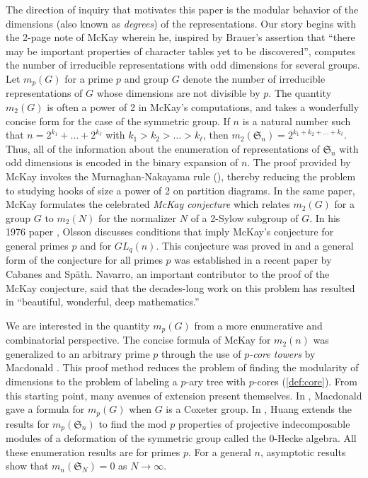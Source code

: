 \documentclass[12pt]{amsart}
\theoremstyle{definition}
\numberwithin{equation}{section}
\renewcommand{\SS}{\mathfrak{S}}
\begin{document}
The direction of inquiry that motivates this paper is the modular behavior of the dimensions (also known as \textit{degrees}) of the representations. Our story begins with the 2-page note of McKay \cite{mckay} wherein he, inspired by Brauer's assertion that ``there may be important properties of character tables yet to be discovered'', computes  the number of irreducible representations with odd dimensions for several groups. Let $m_p(G)$ for a prime $p$ and group $G$ denote the number of irreducible representations of $G$ whose dimensions are not divisible by $p$. The quantity $m_2(G)$ is often a power of 2 in McKay's computations, and takes a wonderfully concise form for the case of the symmetric group. If $n$ is a natural number such that $n = 2^{k_1}+\ldots + 2^{k_\ell}$ with $k_1 > k_2 >\ldots > k_\ell$, then $m_2(\SS_n) = 2^{k_1 + k_2 + \ldots + k_\ell}$. Thus, all of the information about the enumeration of representations of $\SS_n$ with odd dimensions is encoded in the binary expansion of $n$. The proof provided by McKay invokes the Murnaghan-Nakayama rule (\cite[Thm. 10.4.2]{sagan}), thereby reducing the problem to studying hooks of size a power of 2 on partition diagrams. In the same paper, McKay formulates  the celebrated \textit{McKay conjecture} which relates $m_2(G)$ for a group $G$ to $m_2(N)$ for the normalizer $N$ of a 2-Sylow subgroup of $G$. In his 1976 paper \cite{olsson-paper}, Olsson discusses conditions that imply McKay's conjecture for general primes $p$ and for $GL_q(n)$. This conjecture was proved in \cite{mckay-conjecture-odd} and a general form of the conjecture for all primes $p$ was established in a recent paper \cite{mckay-conjecture-full} by Cabanes and Sp\"ath. Navarro, an important contributor to the proof of the McKay conjecture, said that the decades-long work on this problem has resulted in ``beautiful, wonderful, deep mathematics.”  \cite{quanta} 

We are interested in the quantity $m_p(G)$ from a more enumerative and combinatorial perspective. The concise formula of McKay for $m_2(n)$ was generalized to an arbitrary prime $p$ through the use of \textit{$p$-core towers} by Macdonald \cite{mcd}. This proof method reduces the problem of finding the modularity of dimensions to the problem of labeling a $p$-ary tree with $p$-cores (\cref{def:core}). From this starting point, many avenues of extension present themselves. In \cite{mcd-coxeter}, Macdonald gave a formula for $m_p(G)$ when $G$ is a Coxeter group. In
\cite{jia-huang}, Huang extends the results for $m_p(\SS_n)$ to find the mod $p$ properties of projective indecomposable modules of a deformation of the symmetric group called the 0-Hecke algebra. All these enumeration results are for primes $p$. For a general $n$, asymptotic results \cite{peluse} show that $m_n(\SS_N) = 0$ as $N\to \infty$. 
\end{document}
